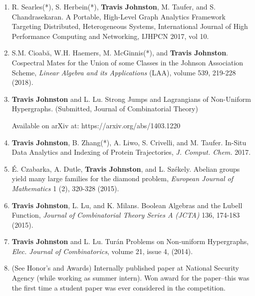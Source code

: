 \documentclass{article}
\begin{document}
	\begin{enumerate}[1.]



		\item R. Searles(*), S. Herbein(*), \textbf{Travis Johnston}, M. Taufer, and S. Chandrasekaran.
		A Portable, High-Level Graph Analytics Framework Targeting Distributed, Heterogeneous Systems,
		International Journal of High Performance Computing and Networking, IJHPCN 2017, vol 10.

		
		\item S.M. Cioab\u{a}, W.H. Haemers, M. McGinnis(*), and \textbf{Travis Johnston}.
		Cospectral Mates for the Union of some Classes in the Johnson Association Scheme, \textit{Linear Algebra and its Applications} (LAA),
        volume 539, 219-228 (2018). 

		
		\item \textbf{Travis Johnston} and L. Lu.  Strong Jumps and Lagrangians of Non-Uniform Hypergraphs.  (Submitted, Journal of Combinatorial Theory)
		
		Available on arXiv at: https://arxiv.org/abs/1403.1220


		\item \textbf{Travis Johnston}, B. Zhang(*), A. Liwo, S. Crivelli, and M. Taufer.  In-Situ Data Analytics and Indexing of Protein Trajectories, 
		\textit{J. Comput. Chem.} 2017.


		\item \'{E}. Czabarka, A. Dutle, \textbf{Travis Johnston}, and L. Sz\'{e}kely. Abelian groups yield many large families for the diamond problem,
		\textit{European Journal of Mathematics} 1 (2), 320-328 (2015).
		

		\item \textbf{Travis Johnston}, L. Lu, and K. Milans.  Boolean Algebras and the Lubell Function,
		\textit{Journal of Combinatorial Theory Series A (JCTA)} 136, 174-183 (2015).
		

		\item \textbf{Travis Johnston} and L. Lu. Tur\'an Problems on Non-uniform Hypergraphs,
		\textit{Elec. Journal of Combinatorics}, volume 21, issue 4, (2014).


		\item (See Honor's and Awards) Internally published paper at National Security Agency (while working as summer intern).
		Won award for the paper--this was the first time a student paper was ever considered in the competition.


\end{enumerate}
\end{document}

